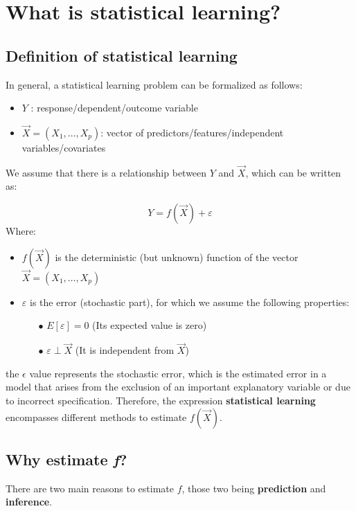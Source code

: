 \graphicspath{{chapters/images/0201/}}

\chapter{What is statistical learning?}
  
  \section{Definition of statistical learning}
    In general, a statistical learning problem can be formalized as follows:

    \begin{itemize}
      \item $Y$ : response/dependent/outcome variable
      \item $\vec{X} = (X_1, \dots, X_p)$: vector of
      predictors/features/independent variables/covariates
    \end{itemize}
    We assume that there is a relationship between $Y$ and $\vec{X}$, which can
    be written as:

    $$Y = f(\vec{X}) + \varepsilon $$ Where:
    \begin{itemize}
      \item $f(\vec{X})$ is the deterministic (but unknown) function of the
      vector $\vec{X} = (X_1, \dots, X_p)$
      \item $\varepsilon$ is the error (stochastic part), for which we assume
      the following properties:
      \begin{itemize}
        \item[$\bullet$] $E[\varepsilon] = 0$ (Its expected value is zero)
        \item[$\bullet$] $\varepsilon \perp \vec{X}$ (It is independent from
        $\vec{X}$)
      \end{itemize}
    \end{itemize}

    the $\epsilon$ value represents the stochastic error, which is the estimated
    error in a model that arises from the exclusion of an important explanatory
    variable or due to incorrect specification. Therefore, the expression
    \textbf{statistical learning} encompasses different methods to estimate
    $f(\vec{X})$. 

  \section{Why estimate \textit{f}?} There are two main reasons to estimate $f$,
    those two being \textbf{prediction} and \textbf{inference}.
  
